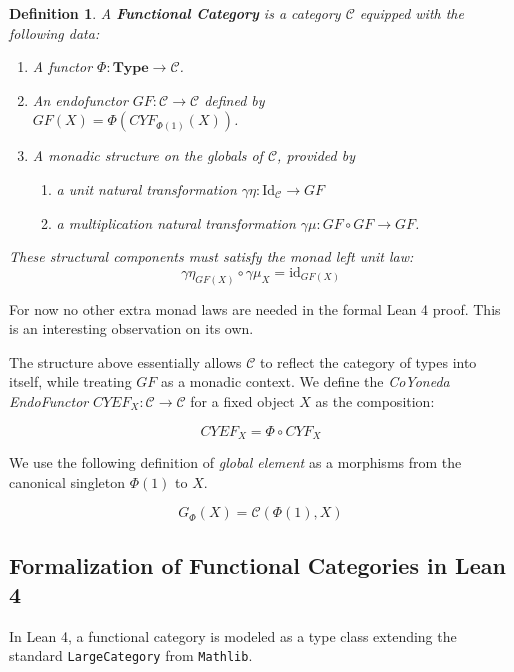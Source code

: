 \documentclass{article}
\newtheorem{definition}[theorem]{Definition}
\begin{document}
\begin{definition}
A \textbf{Functional Category} is a category $\mathcal{C}$ equipped with the following data:
\begin{enumerate}
    \item A functor $\Phi : \mathbf{Type} \to \mathcal{C}$.
    \item An endofunctor $GF : \mathcal{C} \to \mathcal{C}$ defined by \\
          $GF(X) = \Phi(CY\!F_{\Phi(1)}(X))$.
    \item A monadic structure on the globals of $\mathcal{C}$, provided by
    \begin{enumerate}
        \item a unit natural transformation  $\gamma\eta : \text{Id}_{\mathcal{C}} \to GF$
        \item a multiplication natural transformation $\gamma\mu : GF \circ GF \to GF$.
    \end{enumerate}
\end{enumerate}

These structural components must satisfy the monad left unit law: 
\[
\gamma\eta_{GF(X)} \circ \gamma\mu_X = \text{id}_{GF(X)}
\]
\end{definition}

For now no other extra monad laws are needed in the formal Lean 4 proof. This is an interesting
observation on its own.

\vspace{12 pt}

The structure above essentially allows $\mathcal{C}$ to reflect the category of types into itself,
while treating $GF$ as a monadic context. We define the \emph{Co\!Yoneda EndoFunctor}
$CY\!EF_X : \mathcal{C} \to \mathcal{C}$ for a fixed object $X$ as the composition:

\[
CY\!EF_X = \Phi \circ CY\!F_X
\]

We use the following definition of \emph{global element} as a morphisms from the canonical singleton
$\Phi(1)$ to $X$.

\[
G_{\mathit{\Phi}}(X) = \mathcal{C}(\Phi(1), X)
\]


\subsection{Formalization of Functional Categories in Lean 4}

In Lean 4, a functional category is modeled as a type class extending the standard
\texttt{LargeCategory} from \texttt{Mathlib}. 
\end{document}
